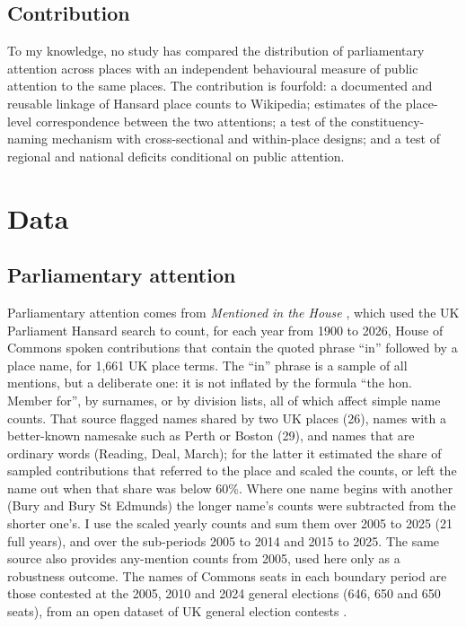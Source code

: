 \documentclass[11pt,a4paper]{article}
\begin{document}
\subsection{Contribution}
To my knowledge, no study has compared the distribution of parliamentary attention across places with an independent behavioural measure of public attention to the same places. The contribution is fourfold: a documented and reusable linkage of Hansard place counts to Wikipedia; estimates of the place-level correspondence between the two attentions; a test of the constituency-naming mechanism with cross-sectional and within-place designs; and a test of regional and national deficits conditional on public attention.

\section{Data}
\subsection{Parliamentary attention}
Parliamentary attention comes from \emph{Mentioned in the House} \citep{Hotham2026}, which used the UK Parliament Hansard search to count, for each year from 1900 to 2026, House of Commons spoken contributions that contain the quoted phrase ``in'' followed by a place name, for 1,661 UK place terms. The ``in'' phrase is a sample of all mentions, but a deliberate one: it is not inflated by the formula ``the hon. Member for'', by surnames, or by division lists, all of which affect simple name counts. That source flagged names shared by two UK places (26), names with a better-known namesake such as Perth or Boston (29), and names that are ordinary words (Reading, Deal, March); for the latter it estimated the share of sampled contributions that referred to the place and scaled the counts, or left the name out when that share was below 60\%. Where one name begins with another (Bury and Bury St Edmunds) the longer name's counts were subtracted from the shorter one's. I use the scaled yearly counts and sum them over 2005 to 2025 (21 full years), and over the sub-periods 2005 to 2014 and 2015 to 2025. The same source also provides any-mention counts from 2005, used here only as a robustness outcome. The names of Commons seats in each boundary period are those contested at the 2005, 2010 and 2024 general elections (646, 650 and 650 seats), from an open dataset of UK general election contests \citep{Hotham2026b}.
\end{document}
